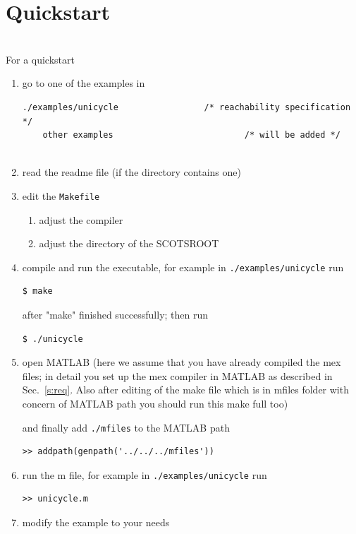 \documentclass[a4paper]{amsart}
\begin{document}
\section{Quickstart}
~ \\
For a quickstart 
\begin{enumerate}
	\item go to one of the examples in
	\begin{lstlisting}[basicstyle=\footnotesize\ttfamily]
	./examples/unicycle      			/* reachability specification */ 
	other examples  						/* will be added */
 
	\end{lstlisting}
	\item read the readme file (if the directory contains one)
	\item edit the {\tt \small Makefile} 
	\begin{enumerate}
		\item adjust the compiler
		\item adjust the directory of the SCOTSROOT 
 \end{enumerate}
	\item compile and run the executable, for example in  {\tt \small ./examples/unicycle} run
\begin{lstlisting}[basicstyle=\small\ttfamily,frame=none]
	$ make
	\end{lstlisting}
	
after  "make"  finished successfully; then run 
	
	\begin{lstlisting}[basicstyle=\small\ttfamily,frame=none]
	$ ./unicycle
\end{lstlisting}

  \item open MATLAB (here we assume that you have already compiled the mex files; in detail you set up the mex compiler in MATLAB as described in Sec.~\ref{s:req}. Also after editing of the make file which is in mfiles folder with concern of MATLAB path you should run this make full too)

    and finally add {\tt \small ./mfiles} to the MATLAB path 
\begin{lstlisting}[basicstyle=\small\ttfamily,frame=none]
  >> addpath(genpath('../../../mfiles')) 
\end{lstlisting}
  \item run the m file, for example in  {\tt \small ./examples/unicycle} run
\begin{lstlisting}[basicstyle=\small\ttfamily,frame=none]
	>> unicycle.m
\end{lstlisting}
\item modify the example to your needs
\end{enumerate}
~ \\
\end{document}
